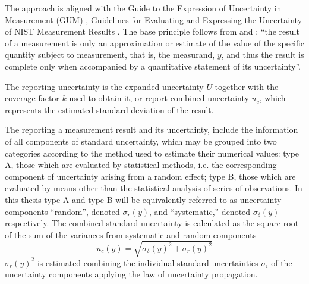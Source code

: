 The approach is aligned with the Guide to the Expression of Uncertainty in Measurement (GUM) \cite{GUM2008}, Guidelines for Evaluating and Expressing the Uncertainty of NIST Measurement Results \cite{NIST1297}. The base principle follows from \cite{GUM2008} and \cite{NIST1297}: ``the result of a measurement is only an approximation or estimate of the value of the specific quantity subject to measurement, that is, the measurand, $y$, and thus the result is complete only when accompanied by a quantitative statement of its uncertainty''.

The reporting uncertainty is the expanded uncertainty $U$ together with the coverage factor $k$ used to obtain it, or report combined uncertainty $u_c$, which represents the estimated standard deviation of the result.

The reporting a measurement result and its uncertainty, include the information of all components of standard uncertainty, which may be grouped into two categories according to the method used to estimate their numerical values: type A, those which are evaluated by statistical methods, i.e. the corresponding component of uncertainty arising from a random effect; type B, those which are evaluated by means other than the statistical analysis of series of observations. In this thesis type A and type B will be equivalently referred to as uncertainty components ``random'', denoted $\sigma_r(y)$, and ``systematic,'' denoted $\sigma_{\delta}(y)$ respectively. The combined standard uncertainty is calculated as the square root of the sum of the variances from systematic and random components
\begin{equation}
	\label{combine_unc}
	u_c(y) = \sqrt{\sigma_{\delta}(y)^2 + \sigma_r(y)^2}
\end{equation}
$\sigma_r(y)^2$ is estimated combining the individual standard uncertainties $\sigma_i$ of the uncertainty components applying the law of uncertainty propagation.

